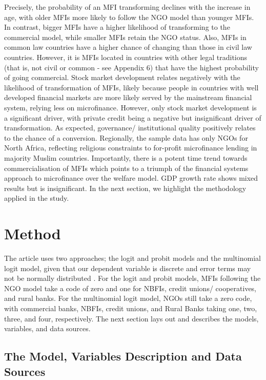 \documentclass[a4paper, nobind]{templates/ociamthesis}
\begin{document}
Precisely, the probability of an MFI transforming declines with the increase in age, with older MFIs more likely to follow the NGO model than younger MFIs. In contrast, bigger MFIs have a higher likelihood of transforming to the commercial model, while smaller MFIs retain the NGO status. Also, MFIs in common law countries have a higher chance of changing than those in civil law countries. However, it is MFIs located in countries with other legal traditions (that is, not civil or common - see Appendix 6) that have the highest probability of going commercial. Stock market development relates negatively with the likelihood of transformation of MFIs, likely because people in countries with well developed financial markets are more likely served by the mainstream financial system, relying less on microfinance. However, only stock market development is a significant driver, with private credit being a negative but insignificant driver of transformation. As expected, governance/ institutional quality positively relates to the chance of a conversion. Regionally, the sample data has only NGOs for North Africa, reflecting religious constraints to for-profit microfinance lending in majority Muslim countries. Importantly, there is a potent time trend towards commercialisation of MFIs which points to a triumph of the financial systems approach to microfinance over the welfare model. GDP growth rate shows mixed results but is insignificant. In the next section, we highlight the methodology applied in the study.

\hypertarget{method}{%
\section{Method}\label{method}}

The article uses two approaches; the logit and probit models and the multinomial logit model, given that our dependent variable is discrete and error terms may not be normally distributed \autocite{cramer2002origins}. For the logit and probit models, MFIs following the NGO model take a code of zero and one for NBFIs, credit unions/ cooperatives, and rural banks. For the multinomial logit model, NGOs still take a zero code, with commercial banks, NBFIs, credit unions, and Rural Banks taking one, two, three, and four, respectively. The next section lays out and describes the models, variables, and data sources.

\hypertarget{the-model-variables-description-and-data-sources}{%
\subsection{The Model, Variables Description and Data Sources}\label{the-model-variables-description-and-data-sources}}
\end{document}
